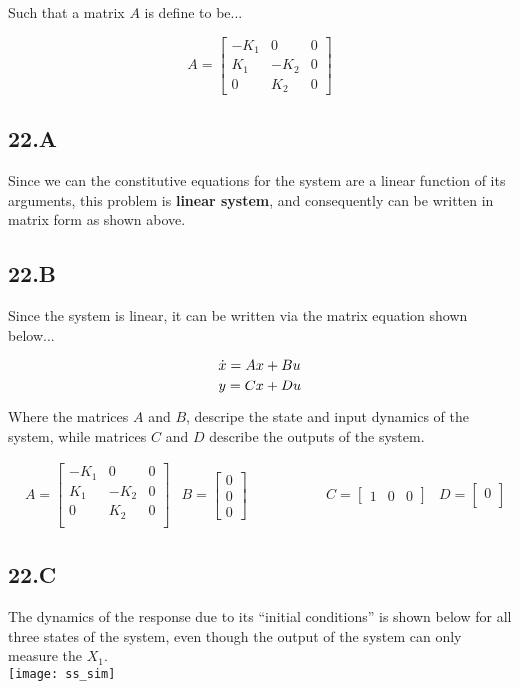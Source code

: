 Such that a matrix $A$ is define to be...

$$
A =
\begin{bmatrix}
    -K_{1} & 0 & 0 \\
    K_{1} & -K_{2} & 0 \\
    0 & K_{2} & 0
\end{bmatrix}
$$

\subsection*{22.A}
Since we can the constitutive equations for the system are a linear function of its arguments, this problem is \textbf{linear system}, and consequently can be written in matrix form as shown above.

\subsection*{22.B}

Since the system is linear, it can be written via the matrix equation shown below...


    $$    \dot{x} = Ax + Bu \\$$
    $$    y = Cx + Du \\$$

\noindent Where the matrices $A$ and $B$, descripe the state and input dynamics of the system, while matrices $C$ and $D$ describe the outputs of the system.

\begin{equation*}
    \begin{aligned}
        & A =
        \begin{bmatrix}
            -K_{1} & 0 & 0 \\
            K_{1} & -K_{2} & 0 \\
            0 & K_{2} & 0 \\
        \end{bmatrix}
        & B =
        \begin{bmatrix}
            0 \\
            0 \\
            0
        \end{bmatrix}
    \end{aligned}
    \qquad \qquad
    \begin{aligned}
        & C =
        \begin{bmatrix}
            1 & 0 & 0
        \end{bmatrix}
        & D =
        \begin{bmatrix}
            0 \\
        \end{bmatrix}
    \end{aligned}
\end{equation*}


\subsection*{22.C}

The dynamics of the response due to its ``initial conditions'' is shown below for all three states of the system, even though the output of the system can only measure the $X_1$. \\


\texttt{[image: ss\_sim]}
